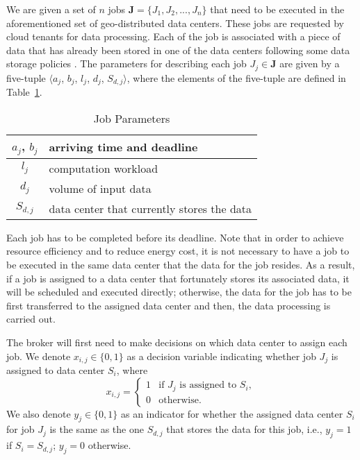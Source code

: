 \documentclass{article}
\begin{document}
We are given a set of $n$ jobs $\mathbf{J} = \{J_1, J_2,..., J_n\}$ that need to be executed in the aforementioned set of geo-distributed data centers. These jobs are requested by cloud tenants for data processing. Each of the job is associated with a piece of data that has already been stored in one of the data centers following some data storage policies \cite{Liu-Storage-2015}. The parameters for describing each job $J_j \in \mathbf{J}$ are given by a five-tuple $\langle$$a_j$, $b_j$, $l_j$, $d_j$, $S_{d, j}$$\rangle$, where the elements of the five-tuple are defined in Table~\ref{tb:notation}.
\begin{table}
\centering
\caption{\label{tb:notation}Job Parameters}
\begin{tabular}{c|l} \hline
	$a_j$, $b_j$ & arriving time and deadline\\ \hline
	$l_j$ & computation workload \\ \hline
	$d_j$ & volume of input data \\ \hline
	$S_{d,j}$ & data center that currently stores the data \\
\hline\end{tabular}
\end{table}
Each job has to be completed before its deadline. Note that in order to achieve resource efficiency and to reduce energy cost, it is not necessary to have a job to be executed in the same data center that the data for the job resides. As a result, if a job is assigned to a data center that fortunately stores its associated data, it will be scheduled and executed directly; otherwise, the data for the job has to be first transferred to the assigned data center and then, the data processing is carried out. 

The broker will first need to make decisions on which data center to assign each job. We denote $x_{i,j} \in \{0, 1\}$ as a decision variable indicating whether job $J_j$ is assigned to data center $S_i$, where
\begin{equation}
x_{i,j} = \left\{
  \begin{array}{ll} 
   1 & \text{if } J_j \text{ is assigned to } S_i, \\
   0 & \text{otherwise}.
  \end{array}
\right.
\end{equation}
We also denote $y_j \in \{0, 1\}$ as an indicator for whether the assigned data center $S_i$ for job $J_j$ is the same as the one $S_{d, j}$ that stores the data for this job, i.e., $y_j = 1$ if $S_i = S_{d,j}$; $y_j = 0$ otherwise.
\end{document}
